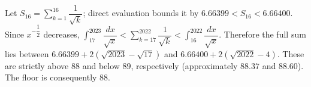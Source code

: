 Let $S_{16}=\sum_{k=1}^{16}\dfrac{1}{\sqrt k}$; direct evaluation bounds it by $6.66399<S_{16}<6.66400$. Since $x^{-\dfrac{1}{2}}$ decreases, $\int_{17}^{2023}\dfrac{dx}{\sqrt x}<\sum_{k=17}^{2022}\dfrac{1}{\sqrt k}<\int_{16}^{2022}\dfrac{dx}{\sqrt x}$. Therefore the full sum lies between $6.66399+2(\sqrt{2023}-\sqrt{17})$ and $6.66400+2(\sqrt{2022}-4)$. These are strictly above $88$ and below $89$, respectively (approximately $88.37$ and $88.60$). The floor is consequently $\boxed{88}$.
